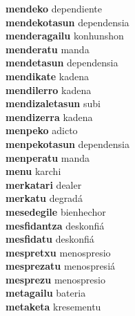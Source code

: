 \textbf{mendeko } dependiente \\
\textbf{mendekotasun } dependensia \\
\textbf{menderagailu } konhunshon \\
\textbf{menderatu } manda \\
\textbf{mendetasun } dependensia \\
\textbf{mendikate } kadena \\
\textbf{mendilerro } kadena \\
\textbf{mendizaletasun } subi \\
\textbf{mendizerra } kadena \\
\textbf{menpeko } adicto \\
\textbf{menpekotasun } dependensia \\
\textbf{menperatu } manda \\
\textbf{menu } karchi \\
\textbf{merkatari } dealer \\
\textbf{merkatu } degradá \\
\textbf{mesedegile } bienhechor \\
\textbf{mesfidantza } deskonfiá \\
\textbf{mesfidatu } deskonfiá \\
\textbf{mespretxu } menospresio \\
\textbf{mesprezatu } menospresiá \\
\textbf{mesprezu } menospresio \\
\textbf{metagailu } bateria \\
\textbf{metaketa } kresementu \\
